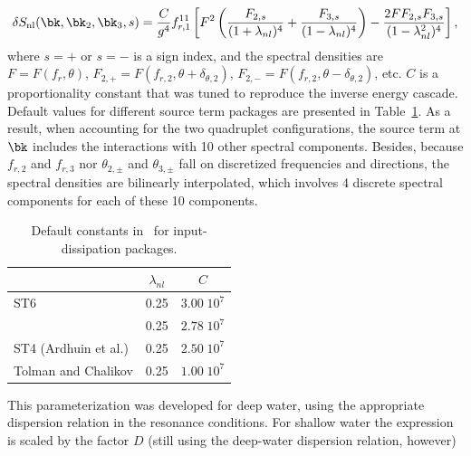 \begin{equation}
\delta S_{\mathrm{nl}}(\bk,\bk_2,\bk_3,s) =  \frac{C}{g^4} f_{r,1}^{11} \left [ F^2 \left ( \frac{F_{2,s}}{(1+\lambda_{nl})^4} +
        \frac{F_{3,s}}{(1-\lambda_{nl})^4} \right ) - \frac{2 F F_{2,s} F_{3,s}}{(1-\lambda_{nl}^2)^4} \right] ,
      \label{eq:snl_dia}
\end{equation}
where $s=+$ or $s=-$ is a sign index, and the spectral densities are  $F = F(f_{r} ,\theta)$, $F_{2,+} = F(f_{r,2} ,\theta + \delta_{\theta,2})$, $F_{2,-} = F(f_{r,2} ,\theta - \delta_{\theta,2})$,  etc.
 $C$ is a proportionality constant that was tuned to reproduce the inverse energy cascade.  Default values for different source term packages are presented in Table~\ref{tab:snl_par}.
As a result, when accounting for the two quadruplet configurations, the source term at $\bk$ includes the interactions with 
10 other spectral components. Besides, because $f_{r,2}$ and $f_{r,3}$ nor $\theta_{2,\pm} $ and $\theta_{3,\pm} $ fall on discretized frequencies and directions, the spectral densities are bilinearly interpolated, which involves 4 discrete spectral components for each of these 10 components. 


\begin{table} \begin{center}
 \begin{tabular}{|l|c|c|} \hline
                    & $\lambda_{nl}$ &     $C$      \\ \hline
ST6                 &      0.25      & $3.00 \; 10^7$  \\ \hline
\wam-3              &      0.25      & $2.78 \; 10^7$  \\ \hline
ST4 (Ardhuin et al.)&      0.25      & $2.50 \; 10^7$  \\ \hline
Tolman and Chalikov &      0.25      & $1.00 \; 10^7$  \\ \hline
\end{tabular} \end{center}
\caption{Default constants in \dia\ for input-dissipation packages.}
\label{tab:snl_par} \botline \end{table}

This parameterization was developed for deep water, using the appropriate dispersion
relation in the resonance conditions. For shallow water the expression is
scaled by the factor $D$ (still using the deep-water dispersion relation,
however)


